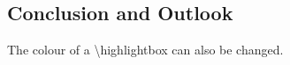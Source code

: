 \begin{multicols}{3}
\columnbreak

\section*{Conclusion and Outlook}

\begin{highlightbox}
	The colour of a \textbackslash highlightbox can also be changed.
\end{highlightbox}



\end{multicols}